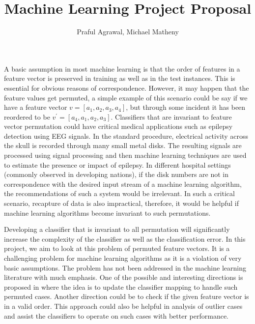 \documentclass[]{article}
\title{Machine Learning Project Proposal}
\author{Praful Agrawal, Michael Matheny}
\begin{document}
	\maketitle
	
	
	A basic assumption in most machine learning is that the order of features in a feature vector is preserved in training as well as in the test instances. This is essential for obvious reasons of correspondence. However, it may happen that the feature values get permuted, a simple example of this scenario could be say if we have a feature vector $v = \left \lbrack a_1, a_2, a_3, a_4 \right\rbrack$, but through some incident it has been reordered to be $v^{'} = \left \lbrack a_4, a_1, a_2, a_3 \right\rbrack$. Classifiers that are invariant to feature vector permutation could have critical medical applications such as epilepsy detection using EEG signals.  In the standard procedure, electrical activity across the skull is recorded through many small metal disks. The resulting signals are processed using signal processing and then machine learning techniques are used to estimate the presence or impact of epilepsy. In different hospital settings (commonly observed in developing nations), if the disk numbers are not in correspondence with the desired input stream of a machine learning algorithm, the recommendations of such a system would be irrelevant. In such a critical scenario, recapture of data is also impractical, therefore, it would be helpful if machine learning algorithms become invariant to such permutations. 
	
	Developing a classifier that is invariant to all permutation will significantly increase the complexity of the classifier as well as the classification error. In this project, we aim to look at this problem of permuted feature vectors. It is a challenging problem for machine learning algorithms as it is a violation of very basic assumptions. The problem has not been addressed in the machine learning literature with much emphasis. One of the possible and interesting directions is proposed in \cite{CGRS10} where the idea is to update the classifier mapping to handle such permuted cases. Another direction could be to check if the given feature vector is in a valid order. This approach could also be helpful in analysis of outlier cases and assist the classifiers to operate on such cases with better performance.
	
\end{document}
